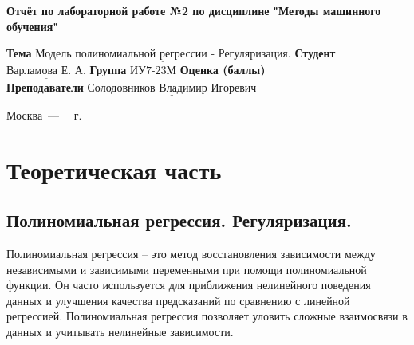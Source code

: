 \documentclass[12pt]{report}
\begin{document}
\begin{titlepage}
	
	\begin{center}
		\noindent\begin{minipage}{1.3\textwidth}\centering
			\Large\textbf{  Отчёт по лабораторной работе №2 по дисциплине}\newline
			\textbf{ "Методы машинного обучения"}\newline\newline
		\end{minipage}
	\end{center}
	
	\noindent\textbf{Тема} $\underline{\text{Модель полиномиальной регрессии - Регуляризация.}}$\newline\newline
	\noindent\textbf{Студент} $\underline{\text{Варламова Е. А.}}$\newline\newline
	\noindent\textbf{Группа} $\underline{\text{ИУ7-23М}}$\newline\newline
	\noindent\textbf{Оценка (баллы)} $\underline{\text{~~~~~~~~~~~~~~~~~~~~~~~~~~~}}$\newline\newline
	\noindent\textbf{Преподаватели} $\underline{\text{Солодовников Владимир Игоревич}}$\newline\newline\newline
	
	\begin{center}
		\vfill
		Москва~---~\the\year
		~г.
	\end{center}
\end{titlepage}
\large
\setcounter{page}{2}
\def\contentsname{СОДЕРЖАНИЕ}
\renewcommand{\contentsname}{СОДЕРЖАНИЕ}
\tableofcontents
\renewcommand\labelitemi{---}
\newpage
\chapter{Теоретическая часть}
\section{Полиномиальная регрессия. Регуляризация.}

Полиномиальная регрессия -- это метод восстановления зависимости между независимыми и зависимыми переменными при помощи полиномиальной функции. Он часто используется для приближения нелинейного поведения данных и улучшения качества предсказаний по сравнению с линейной регрессией. Полиномиальная регрессия позволяет уловить сложные взаимосвязи в данных и учитывать нелинейные зависимости.
\end{document}

